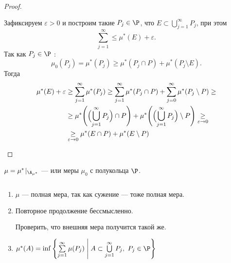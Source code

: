 \begin{proof}
\begin{description}
			Зафиксируем $ \varepsilon >0$ и построим такие $ P_j \in \P$, что $ E \subset \bigcup\limits_{j=1}^{\infty} P_j$, при этом
			\[
			\sum_{j=1}^{\infty} \le \mu^*( E )+\varepsilon 
			.\] 
			Так как $ P_j \in \P$ :
			\[
				\mu_0(P_j) = \mu^*( P_j ) \ge \mu^*( P_j \cap P ) + \mu^*( P_j \setminus E )
			.\] 
			Тогда
			\[
			\begin{aligned}
				\mu^*( E )  + \varepsilon  &\ge  \sum_{j=1}^{\infty} \mu^*( P_j )  \ge \sum_{j=1}^{\infty} \mu^*( P_j \cap P )  + \sum_{j=0}^{\infty} \mu^*( P_j \setminus P )  \ge \\
										   & \ge \mu^*\Biggl( \Bigl(\bigcup_{j=1}^{\infty} P_j \Bigr) \cap P\Biggr) + \mu^*\Biggl( \Bigl(  \bigcup_{j=1}^{\infty} P_j\Bigr)\setminus P\Biggr) \underset{\varepsilon  \to  0}{\ge} \\
										   &\underset{\varepsilon \to  0}{\ge} \mu^*( E \cap P ) + \mu^*( E \setminus P )
			\end{aligned}
			\]
	\end{description} 
\end{proof}
\begin{defn}
	$ \mu = \mu^{*}\!\mid_{\A_{\mu^{*}}}$ ---   или  меры $ \mu_0$ с полукольца $ \P$. 
\end{defn}

\begin{note}
    $ $
	\begin{enumerate}
	    \item $ \mu$ --- полная мера, так как сужение --- тоже полная мера.
		\item Повторное продолжение бессмысленно. 
			\begin{prac}
			    Проверить, что внешняя мера получится такой же.
			\end{prac}
		\item $ \mu^{*} (A) = \inf \left\{ \sum\limits_{j=1}^{\infty} \mu  (P_j) \Biggm| A \subset \bigcup\limits_{j=1}^{\infty} P_j, ~P_j \in \P \right\} $
	\end{enumerate} 
\end{note}

		\fontAwesomeSymbol{\faSend}

